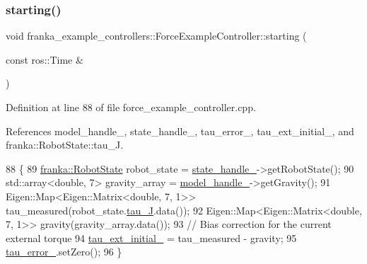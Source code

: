 \subsubsection{\texorpdfstring{starting()}{starting()}}
{\footnotesize\ttfamily void franka\+\_\+example\+\_\+controllers\+::\+Force\+Example\+Controller\+::starting (\begin{DoxyParamCaption}\item[{const ros\+::\+Time \&}]{ }\end{DoxyParamCaption})\hspace{0.3cm}{\ttfamily [override]}}



Definition at line 88 of file force\+\_\+example\+\_\+controller.\+cpp.



References model\+\_\+handle\+\_\+, state\+\_\+handle\+\_\+, tau\+\_\+error\+\_\+, tau\+\_\+ext\+\_\+initial\+\_\+, and franka\+::\+Robot\+State\+::tau\+\_\+J.


\begin{DoxyCode}
88                                                       \{
89   \hyperlink{structfranka_1_1RobotState}{franka::RobotState} robot\_state = \hyperlink{classfranka__example__controllers_1_1ForceExampleController_a4b932a6c22504e9728c57b5fa7ccd620}{state\_handle\_}->getRobotState();
90   std::array<double, 7> gravity\_array = \hyperlink{classfranka__example__controllers_1_1ForceExampleController_a97bc82b7bea28c31389b857f25adbe47}{model\_handle\_}->getGravity();
91   Eigen::Map<Eigen::Matrix<double, 7, 1>> tau\_measured(robot\_state.\hyperlink{structfranka_1_1RobotState_ad90e2518d661da0d8fa4c864bae210e5}{tau\_J}.data());
92   Eigen::Map<Eigen::Matrix<double, 7, 1>> gravity(gravity\_array.data());
93   \textcolor{comment}{// Bias correction for the current external torque}
94   \hyperlink{classfranka__example__controllers_1_1ForceExampleController_a5de4c22bd3d9d27f039f33f0c10fa11f}{tau\_ext\_initial\_} = tau\_measured - gravity;
95   \hyperlink{classfranka__example__controllers_1_1ForceExampleController_a2e250641c7304512f8a30be65f276f63}{tau\_error\_}.setZero();
96 \}
\end{DoxyCode}
\mbox{\label{classfranka__example__controllers_1_1ForceExampleController_ae15ee13e9cb72653edb468127e65fa3c}} 
